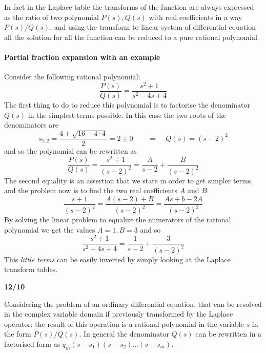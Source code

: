 	In fact in the Laplace table the transforms of the function are always expressed as the ratio of two polynomial $P(s),Q(s)$ with real coefficients in a way $P(s)/Q(s)$, and using the transform to linear system of differential equation all the solution for all the function can be reduced to a pure rational polynomial.
		
	\paragraph{Partial fraction expansion with an example} Consider the following rational polynomial:
	\[ \frac{P(s)}{Q(s)} = \frac{s^2+1}{s^2-4s+4} \]
	The first thing to do to reduce this polynomial is to factorise the denominator $Q(s)$ in the simplest terms possible. In this case the two roots of the denominators are
	\[ s_{1,2} = \frac{4 \pm \sqrt{16 - 4 \cdot 4}}{2} = 2 \pm 0 \qquad \Rightarrow \quad Q(s) = (s-2)^2 \]
	and so the polynomial can be rewritten as
	\[ \frac{P(s)}{Q(s)} = \frac{s^2+1}{(s-2)^2} = \frac{A}{s-2} + \frac{B}{(s-2)^2} \]
	The second equality is an assertion that we state in order to get simpler terms, and the problem now is to find the two real coefficients $A$ and $B$:
	\[ \frac{s+1}{(s-2)^2} = \frac{A(s-2)+B}{(s-2)^2} = \frac{As + b - 2A}{(s-2)^2}  \]
	By solving the linear problem to equalize the numerators of the rational polynomial we get the values $A=1,B=3$ and so
	\[ \frac{s^2+1}{s^2-4s+4} = \frac 1 {s-2} + \frac{3}{(s-2)^2} \]
	This \textit{little terms} can be easily inverted by simply looking at the Laplace transform tables.
		
	\textbf{12/10}
	
	Considering the problem of an ordinary differential equation, that can be resolved in the complex variable domain if previously transformed by the Laplace operator: the result of this operation is a rational polynomial in the variable $s$ in the form $P(s)/Q(s)$. In general the denominator $Q(s)$ can be rewritten in a factorised form as $q_m(s-s_1)(s-s_2)\dots(s-s_m)$.
	
